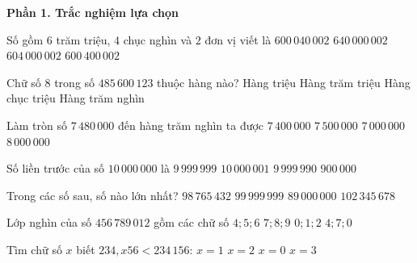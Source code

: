 \textbf{Phần 1. Trắc nghiệm lựa chọn}

\begin{ex} %
Số gồm $6$ trăm triệu, $4$ chục nghìn và $2$ đơn vị viết là
\choice
{\True $600\,040\,002$}
{$640\,000\,002$}
{$604\,000\,002$}
{$600\,400\,002$}
\end{ex}

\begin{ex} %
Chữ số 8 trong số $485\,600\,123$ thuộc hàng nào?
\choice
{Hàng triệu}
{Hàng trăm triệu}
{\True Hàng chục triệu}
{Hàng trăm nghìn}
\end{ex}

\begin{ex} %
Làm tròn số $7\,480\,000$ đến hàng trăm nghìn ta được
\choice
{$7\,400\,000$}
{\True $7\,500\,000$}
{$7\,000\,000$}
{$8\,000\,000$}
\end{ex}

\begin{ex} %
Số liền trước của số $10\,000\,000$ là
\choice
{\True $9\,999\,999$}
{$10\,000\,001$}
{$9\,999\,990$}
{$900\,000$}
\end{ex}

\begin{ex} %
Trong các số sau, số nào lớn nhất?
\choice
{$98\,765\,432$}
{$99\,999\,999$}
{$89\,000\,000$}
{\True $102\,345\,678$}
\end{ex}

\begin{ex} %
Lớp nghìn của số $456\,789\,012$ gồm các chữ số
\choice
{$4; 5; 6$}
{\True $7; 8; 9$}
{$0; 1; 2$}
{$4; 7; 0$}
\end{ex}

\begin{ex} %
Tìm chữ số $x$ biết $234,x56 < 234\,156$:
\choice
{$x = 1$}
{$x = 2$}
{\True $x = 0$}
{$x = 3$}
\end{ex}

